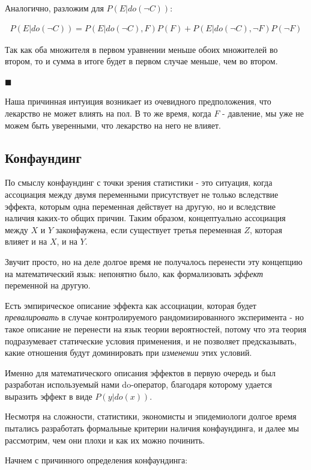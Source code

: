 \documentclass[fleqn]{article}
\numberwithin{equation}{section}
\numberwithin{theorem}{section}
\numberwithin{figure}{section}
\numberwithin{lemma}{section}
\numberwithin{corollary}{section}
\begin{document}
Аналогично, разложим для $P(E|do(\neg C))$:

\begin{align}
	P(E|do(\neg C)) = P(E|do(\neg C),F)P(F) + P(E|do(\neg C),\neg F)P(\neg F)
\end{align}

Так как оба множителя в первом уравнении меньше обоих множителей во втором, то и сумма в итоге будет в первом случае меньше, чем во втором.

$\blacksquare$

Наша причинная интуиция возникает из очевидного предположения, что лекарство не может влиять на пол. В то же время, когда  $F$ - давление, мы уже не можем быть уверенными, что лекарство на него не влияет.

\subsection*{Конфаундинг}

По смыслу конфаундинг с точки зрения статистики - это ситуация, когда ассоциация между двумя переменными присутствует не только вследствие эффекта, которым одна переменная действует на другую, но и вследствие наличия каких-то общих причин. Таким образом, концептуально ассоциация между $X$ и $Y$ законфаужена, если существует третья переменная $Z$, которая влияет и на $X$, и на $Y$.

Звучит просто, но на деле долгое время не получалось перенести эту концепцию на математический язык: непонятно было, как формализовать \textit{эффект} переменной на другую.


Есть эмпирическое описание эффекта как ассоциации, которая будет \textit{превалировать} в случае контролируемого рандомизированного эксперимента - но такое описание не перенести на язык теории вероятностей, потому что эта теория подразумевает статические условия применения, и не позволяет предсказывать, какие отношения будут доминировать при \textit{изменении} этих условий.

Именно для математического описания эффектов в первую очередь и был разработан используемый нами do-оператор, благодаря которому удается выразить эффект в виде $P(y|do(x))$.

Несмотря на сложности, статистики, экономисты и эпидемиологи долгое время пытались разработать формальные критерии наличия конфаундинга, и далее мы рассмотрим, чем они плохи и как их можно починить.

Начнем с причинного определения конфаундинга:
\end{document}
